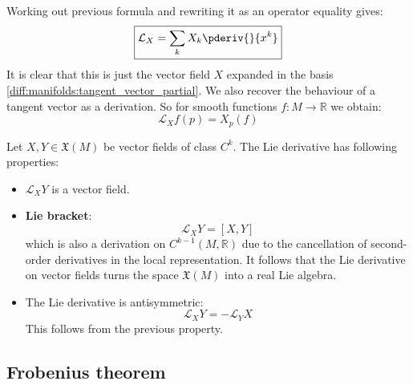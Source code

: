 	\begin{formula}[$\dag$]\label{manifolds:ex:lie_derivative_function}
		Working out previous formula and rewriting it as an operator equality gives:
		\begin{equation}
			\label{manifolds:lie_derivative_function_expansion}
			\boxed{\mathcal{L}_X = \sum_kX_k\pderiv{}{x^k}}
		\end{equation}
		It is clear that this is just the vector field $X$ expanded in the basis \ref{diff:manifolds:tangent_vector_partial}. We also recover the behaviour of a tangent vector as a derivation. So for smooth functions $f:M\rightarrow\mathbb{R}$ we obtain:
		\begin{equation}
			\mathcal{L}_Xf(p) = X_p(f)
		\end{equation}
	\end{formula}
	
	\begin{property}
		Let $X, Y\in\mathfrak{X}(M)$ be vector fields of class $C^k$. The Lie derivative has following properties:
		\begin{itemize}
			\item $\mathcal{L}_XY$ is a vector field.
			\item \textbf{Lie bracket}:
				\begin{equation}
					\label{manifolds:lie_bracket}
					\mathcal{L}_XY = [X, Y]
				\end{equation}
				which is also a derivation on $C^{k-1}(M, \mathbb{R})$ due to the cancellation of second-order derivatives in the local representation. It follows that the Lie derivative on vector fields turns the space $\mathfrak{X}(M)$ into a real Lie algebra.
			\item The Lie derivative is antisymmetric:
				\begin{equation}
					\mathcal{L}_XY = -\mathcal{L}_YX
				\end{equation}
				This follows from the previous property.
		\end{itemize}
	\end{property}

\subsection{Frobenius theorem}
	
